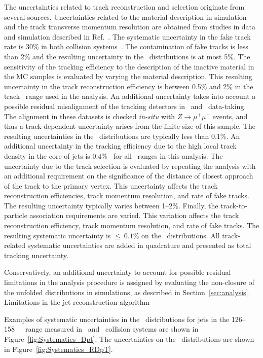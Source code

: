 The uncertainties related to track reconstruction and selection originate from several sources.
Uncertainties related to the material description in simulation and the track transverse 
momentum resolution are obtained from studies in data and simulation described in Ref.~\cite{ATL-PHYS-PUB-2015-051}.
The systematic uncertainty in the fake track rate is 30\% in both collision systems~\cite{ATL-PHYS-PUB-2015-051}.  The contamination of fake tracks is less than 2\% and the resulting uncertainty in the \Dptr\ distributions is at most 5\%.
The sensitivity of the tracking efficiency to the description of the 
inactive material in the MC samples is evaluated by varying the material description.
This resulting uncertainty in the track reconstruction efficiency is between
0.5\% and 2\% in the track \pT\ range used in the analysis. 
An additional uncertainty takes into account a possible residual misalignment of the tracking detectors
in \pp\ and \PbPb\ data-taking. The alignment in these datasets is checked \textit{in-situ} with $Z\rightarrow \mu^{+}\mu^{-}$ events, and thus a track-\pT\-dependent uncertainty arises from the finite size of this sample. The resulting uncertainties in
the \Dptr\ distributions are typically less than 0.1\%. An additional  uncertainty in the tracking efficiency due to the high local track density in the core of jets is 0.4\%~\cite{ATL-PHYS-PUB-2016-007} for all \ptjet\ ranges in this analysis. The uncertainty due to the track selection is evaluated by repeating the analysis with an additional requirement on the significance of the distance of closest approach of the track to the primary vertex. This uncertainty affects 
the track reconstruction efficiencies, track momentum resolution, and rate of fake tracks. The resulting uncertainty typically varies between 1--2\%.
Finally, the track-to-particle association requirements are varied. This variation affects the track reconstruction efficiency, track momentum resolution, and rate of fake tracks. The resulting systematic uncertainty is $\leq~0.1 \%$ on the \Dptr\ distributions. All track-related systematic uncertainties are added in quadrature and presented as total tracking uncertainty. 

Conservatively, an additional uncertainty to account for possible residual limitations in the analysis procedure is assigned by evaluating the non-closure of the unfolded distributions in simulations, as described in Section~\ref{sec:analysis}. Limitations in the jet reconstruction algorithm 

Examples of systematic uncertainties in the \Dptr\ distributions for jets in the 126--158~\GeV\ \ptjet\ 
range measured in \pp\ and \pbpb\ collision systems are shown in Figure~\ref{fig:Systematics_Dpt}. The uncertainties on the \RDptr\ distributions are shown in Figure~\ref{fig:Systematics_RDpT}.

